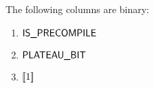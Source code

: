 The following columns are binary:
\begin{multicols}{3}
\begin{enumerate}
	\item $\textsf{IS\_PRECOMPILE}$
	\item $\textsf{PLATEAU\_BIT}$
	\item $[\![1]\!]$
\end{enumerate}
\end{multicols}
